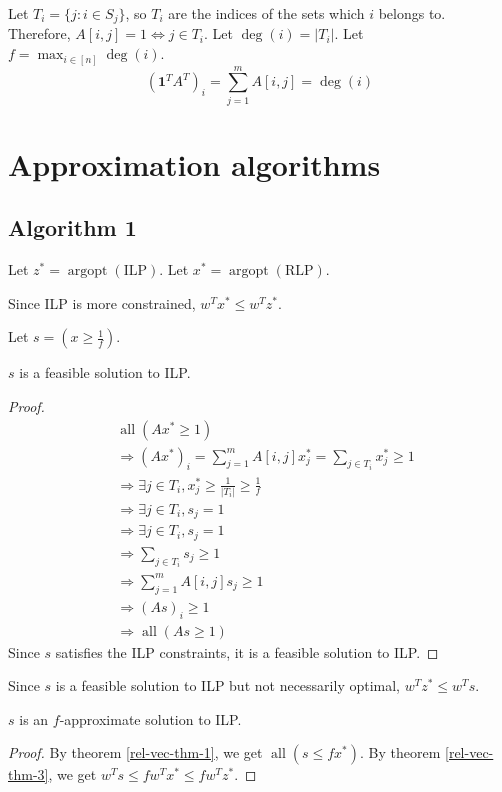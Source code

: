 Let $T_i = \{j: i \in S_j\}$, so $T_i$ are the indices of the sets which $i$ belongs to.
Therefore, $A[i, j] = 1 \iff j \in T_i$.
Let $\deg(i) = |T_i|$.
Let $f = \max_{i \in [n]} \deg(i)$.
\[ (\mathbf{1}^T A^T)_i
= \sum_{j=1}^m A[i, j]
= \deg(i) \]

\section{Approximation algorithms}

\subsection{Algorithm 1}

Let $z^* = \operatorname{argopt}(\textrm{ILP})$.
Let $x^* = \operatorname{argopt}(\textrm{RLP})$.

Since ILP is more constrained, $w^Tx^* \le w^Tz^*$.

Let $s = (x \ge \frac{1}{f})$.

\begin{theorem}
$s$ is a feasible solution to ILP.
\end{theorem}
\begin{proof}
\begin{align*}
& \operatorname{all}(Ax^* \ge 1)
\\ &\Rightarrow (Ax^*)_i = \sum_{j=1}^m A[i, j]x^*_j = \sum_{j \in T_i} x^*_j \ge 1
\\ &\Rightarrow \exists j \in T_i, x^*_j \ge \frac{1}{|T_i|} \ge \frac{1}{f}
\\ &\Rightarrow \exists j \in T_i, s_j = 1
\\ &\Rightarrow \exists j \in T_i, s_j = 1
\\ &\Rightarrow \sum_{j \in T_i} s_j \ge 1
\\ &\Rightarrow \sum_{j=1}^m A[i, j]s_j \ge 1
\\ &\Rightarrow (As)_i \ge 1
\\ &\Rightarrow \operatorname{all}(As \ge 1)
\end{align*}
Since $s$ satisfies the ILP constraints, it is a feasible solution to ILP.
\end{proof}
Since $s$ is a feasible solution to ILP but not necessarily optimal, $w^Tz^* \le w^Ts$.

\begin{theorem}
$s$ is an $f$-approximate solution to ILP.
\end{theorem}
\begin{proof}
By theorem \ref{rel-vec-thm-1}, we get $\operatorname{all}(s \le fx^*)$.
By theorem \ref{rel-vec-thm-3}, we get $w^Ts \le fw^Tx^* \le fw^Tz^*$.
\end{proof}

